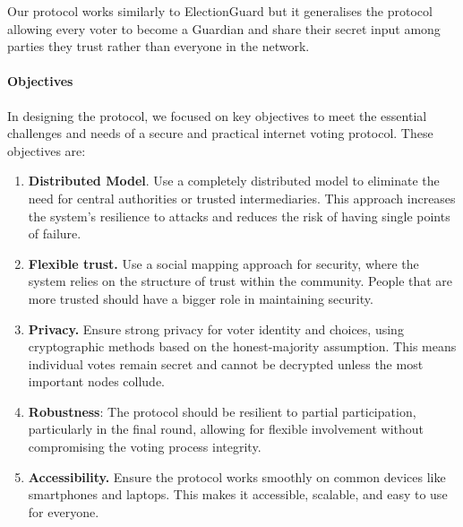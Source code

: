 \documentclass[runningheads]{llncs}
\begin{document}
Our protocol works similarly to ElectionGuard but it generalises the protocol allowing every voter to become a Guardian and share their secret input among parties they trust rather than everyone in the network. 

\paragraph{Objectives}
In designing the protocol, we focused on key objectives to meet the essential challenges and needs of a secure and practical internet voting protocol. These objectives are:

\begin{enumerate}
    \item \textbf{Distributed Model}. Use a completely distributed model to eliminate the need for central authorities or trusted intermediaries. This approach increases the system's resilience to attacks and reduces the risk of having single points of failure.
    \item \textbf{Flexible trust.} Use a social mapping approach for security, where the system relies on the structure of trust within the community. People that are more trusted should have a bigger role in maintaining security.
    \item \textbf{Privacy.} Ensure strong privacy for voter identity and choices, using cryptographic methods based on the honest-majority assumption. This means individual votes remain secret and cannot be decrypted unless the most important nodes collude.
    \item \textbf{Robustness}: The protocol should be resilient to partial participation, particularly in the final round, allowing for flexible involvement without compromising the voting process integrity.
    \item \textbf{Accessibility.} Ensure the protocol works smoothly on common devices like smartphones and laptops. This makes it accessible, scalable, and easy to use for everyone.
\end{enumerate}


\newcommand{\PartySecretKey}[1]{\ensuremath{s_{#1}}}
\newcommand{\Party}[1]{\ensuremath{P_{#1}}}

\newcommand{\EncryptionKey}{\textbf{E}}
\newcommand{\DecryptionKey}{\textbf{d}}

\newcommand{\PartialDecryptionKey}[1]{\ensuremath{d_{#1}}}
\newcommand{\PartialEncryptionKey}[1]{\ensuremath{E_{#1}}}
\end{document}
